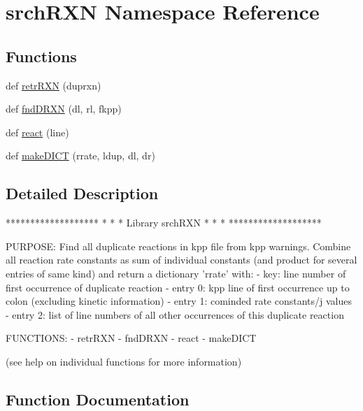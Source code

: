 \hypertarget{namespacesrchRXN}{}\section{srch\+R\+XN Namespace Reference}
\label{namespacesrchRXN}
\subsection*{Functions}
\begin{DoxyCompactItemize}
\item 
def \mbox{\hyperlink{namespacesrchRXN_a954f72527cf0bb8f711f715c6919a936}{retr\+R\+XN}} (duprxn)
\item 
def \mbox{\hyperlink{namespacesrchRXN_a6683edc21ab66d0a7ecf4ecb98a8fe5f}{fnd\+D\+R\+XN}} (dl, rl, fkpp)
\item 
def \mbox{\hyperlink{namespacesrchRXN_a0d86abe53fd006f2f6ec9ea9e613a017}{react}} (line)
\item 
def \mbox{\hyperlink{namespacesrchRXN_a2d5632f8f982579d62c5b03a0d172de6}{make\+D\+I\+CT}} (rrate, ldup, dl, dr)
\end{DoxyCompactItemize}


\subsection{Detailed Description}
\begin{DoxyVerb}*******************
*                 *
* Library srchRXN *
*                 *
*******************

PURPOSE:
Find all duplicate reactions in kpp file from kpp warnings. Combine
all reaction rate constants as sum of individual constants (and
product for several entries of same kind) and return a dictionary
'rrate' with:
- key:      line number of first occurrence of duplicate reaction
- entry 0:  kpp line of first occurrence up to colon
            (excluding kinetic information)
- entry 1:  cominded rate constants/j values
- entry 2:  list of line numbers of all other occurrences of
            this duplicate reaction

FUNCTIONS:
- retrRXN
- fndDRXN
- react
- makeDICT

(see help on individual functions for more information)
\end{DoxyVerb}
 

\subsection{Function Documentation}
\mbox{\label{namespacesrchRXN_a6683edc21ab66d0a7ecf4ecb98a8fe5f}} 
